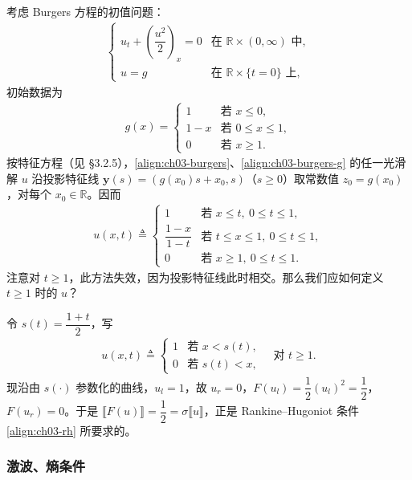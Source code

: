\documentclass[../../main.tex]{subfiles}
\begin{document}
\begin{example}[激波]\label{example:ch03-shock}考虑 Burgers 方程的初值问题：
\begin{align}\label{align:ch03-burgers}
\begin{cases}
u_t+\left(\dfrac{u^2}{2}\right)_x=0 & \text{在 }\mathbb{R}\times(0,\infty)\text{ 中},\\
u=g & \text{在 }\mathbb{R}\times\{t=0\}\text{ 上},
\end{cases}
\end{align}
初始数据为
\begin{align}\label{align:ch03-burgers-g}
g(x)=
\begin{cases}
1 & \text{若 }x\leqslant 0,\\
1-x & \text{若 }0\leqslant x\leqslant 1,\\
0 & \text{若 }x\geqslant 1.
\end{cases}
\end{align}
按特征方程（见 \S3.2.5），\eqref{align:ch03-burgers}、\eqref{align:ch03-burgers-g} 的任一光滑解 $u$ 沿投影特征线 $\mathbf{y}(s)=(g(x_0)s+x_0,s)$（$s\geqslant 0$）取常数值 $z_0=g(x_0)$，对每个 $x_0\in\mathbb{R}$。因而
\begin{align*}
u(x,t)\triangleq
\begin{cases}
1 & \text{若 }x\leqslant t,\ 0\leqslant t\leqslant 1,\\
\dfrac{1-x}{1-t} & \text{若 }t\leqslant x\leqslant 1,\ 0\leqslant t\leqslant 1,\\
0 & \text{若 }x\geqslant 1,\ 0\leqslant t\leqslant 1.
\end{cases}
\end{align*}
注意对 $t\geqslant 1$，此方法失效，因为投影特征线此时相交。那么我们应如何定义 $t\geqslant 1$ 时的 $u$？

令 $s(t)=\dfrac{1+t}{2}$，写
\begin{align*}
u(x,t)\triangleq
\begin{cases}
1 & \text{若 }x<s(t),\\
0 & \text{若 }s(t)<x,
\end{cases}
\quad \text{对 }t\geqslant 1.
\end{align*}
现沿由 $s(\cdot)$ 参数化的曲线，$u_l=1$，故 $u_r=0$，$F(u_l)=\dfrac{1}{2}(u_l)^2=\dfrac{1}{2}$，$F(u_r)=0$。于是 $\llbracket F(u)\rrbracket=\dfrac{1}{2}=\sigma\llbracket u\rrbracket$，正是 Rankine--Hugoniot 条件\eqref{align:ch03-rh} 所要求的。
\end{example}

\subsubsection{激波、熵条件}
\end{document}
